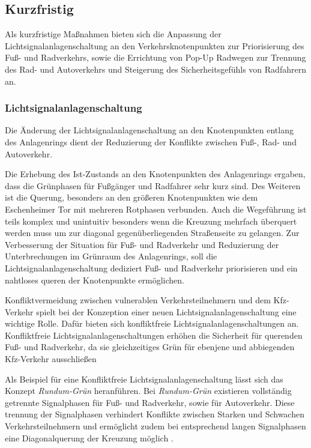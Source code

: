 \documentclass[a4paper,12pt]{article}
\begin{document}
\subsection{Kurzfristig}

Als kurzfristige Maßnahmen bieten sich die Anpassung der Lichtsignalanlagenschaltung an den Verkehrsknotenpunkten zur Priorisierung des Fuß- und Radverkehrs, sowie die Errichtung von Pop-Up Radwegen zur Trennung des Rad- und Autoverkehrs und Steigerung des Sicherheitsgefühls von Radfahrern an.

\subsubsection{Lichtsignalanlagenschaltung}

Die Änderung der Lichtsignalanlagenschaltung an den Knotenpunkten entlang des Anlagenrings dient der Reduzierung der Konflikte zwischen Fuß-, Rad- und Autoverkehr.

Die Erhebung des Ist-Zustands an den Knotenpunkten des Anlagenrings ergaben, dass die Grünphasen für Fußgänger und Radfahrer sehr kurz sind. Des Weiteren ist die Querung, besonders an den größeren Knotenpunkten wie dem Eschenheimer Tor mit mehreren Rotphasen verbunden. Auch die Wegeführung ist teils komplex und unintuitiv besonders wenn die Kreuzung mehrfach überquert werden muss um zur diagonal gegenüberliegenden Straßenseite zu gelangen.
Zur Verbesserung der Situation für Fuß- und Radverkehr und Reduzierung der Unterbrechungen im Grünraum des Anlagenrings, soll die Lichtsignalanlagenschaltung dediziert Fuß- und Radverkehr priorisieren und ein nahtloses queren der Knotenpunkte ermöglichen.

Konfliktvermeidung zwischen vulnerablen Verkehrsteilnehmern und dem Kfz-Verkehr spielt bei der Konzeption einer neuen Lichtsignalanlagenschaltung eine wichtige Rolle. Dafür bieten sich konfliktfreie Lichtsignalanlagenschaltungen an. Konfliktfreie Lichtsignalanlagenschaltungen erhöhen die Sicherheit für querenden Fuß- und Radverkehr, da sie gleichzeitiges Grün für ebenjene und abbiegenden Kfz-Verkehr ausschließen \autocite[11]{zotero-item-63}

Als Beispiel für eine Konfliktfreie Lichtsignalanlagenschaltung lässt sich das Konzept \textit{Rundum-Grün} heranführen. Bei \textit{Rundum-Grün} existieren vollständig getrennte Signalphasen für Fuß- und Radverkehr, sowie für Autoverkehr. Diese trennung der Signalphasen verhindert Konflikte zwischen Starken und Schwachen Verkehrsteilnehmern und ermöglicht zudem bei entsprechend langen Signalphasen eine Diagonalquerung der Kreuzung möglich \autocite[12]{zotero-item-63}.
\end{document}
